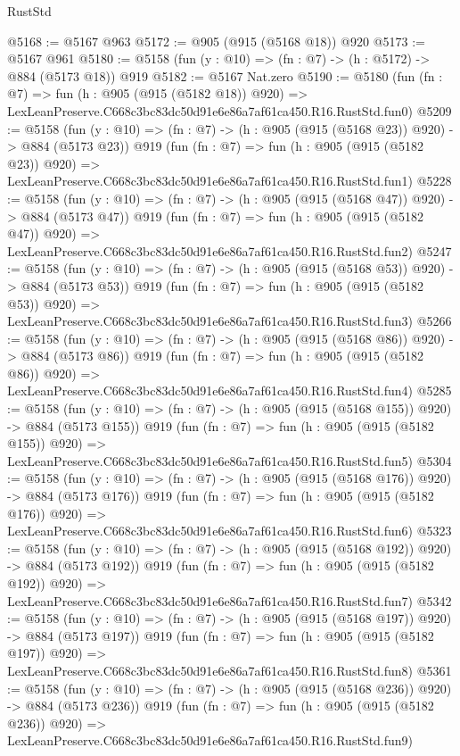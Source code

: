 \begin{lexlean}{RustStd}
\begin{coremodule}
@5168 := @5167 @963
@5172 := @905 (@915 (@5168 @18)) @920
@5173 := @5167 @961
@5180 := @5158 (fun (y : @10) => (fn : @7) -> (h : @5172) -> @884 (@5173 @18)) @919
@5182 := @5167 Nat.zero
@5190 := @5180
    (fun (fn : @7) =>
    fun (h : @905 (@915 (@5182 @18)) @920) =>
    LexLeanPreserve.C668c3bc83dc50d91e6e86a7af61ca450.R16.RustStd.fun0)
@5209 := @5158
    (fun (y : @10) => (fn : @7) -> (h : @905 (@915 (@5168 @23)) @920) -> @884 (@5173 @23))
    @919
    (fun (fn : @7) =>
    fun (h : @905 (@915 (@5182 @23)) @920) =>
    LexLeanPreserve.C668c3bc83dc50d91e6e86a7af61ca450.R16.RustStd.fun1)
@5228 := @5158
    (fun (y : @10) => (fn : @7) -> (h : @905 (@915 (@5168 @47)) @920) -> @884 (@5173 @47))
    @919
    (fun (fn : @7) =>
    fun (h : @905 (@915 (@5182 @47)) @920) =>
    LexLeanPreserve.C668c3bc83dc50d91e6e86a7af61ca450.R16.RustStd.fun2)
@5247 := @5158
    (fun (y : @10) => (fn : @7) -> (h : @905 (@915 (@5168 @53)) @920) -> @884 (@5173 @53))
    @919
    (fun (fn : @7) =>
    fun (h : @905 (@915 (@5182 @53)) @920) =>
    LexLeanPreserve.C668c3bc83dc50d91e6e86a7af61ca450.R16.RustStd.fun3)
@5266 := @5158
    (fun (y : @10) => (fn : @7) -> (h : @905 (@915 (@5168 @86)) @920) -> @884 (@5173 @86))
    @919
    (fun (fn : @7) =>
    fun (h : @905 (@915 (@5182 @86)) @920) =>
    LexLeanPreserve.C668c3bc83dc50d91e6e86a7af61ca450.R16.RustStd.fun4)
@5285 := @5158
    (fun (y : @10) => (fn : @7) -> (h : @905 (@915 (@5168 @155)) @920) -> @884 (@5173 @155))
    @919
    (fun (fn : @7) =>
    fun (h : @905 (@915 (@5182 @155)) @920) =>
    LexLeanPreserve.C668c3bc83dc50d91e6e86a7af61ca450.R16.RustStd.fun5)
@5304 := @5158
    (fun (y : @10) => (fn : @7) -> (h : @905 (@915 (@5168 @176)) @920) -> @884 (@5173 @176))
    @919
    (fun (fn : @7) =>
    fun (h : @905 (@915 (@5182 @176)) @920) =>
    LexLeanPreserve.C668c3bc83dc50d91e6e86a7af61ca450.R16.RustStd.fun6)
@5323 := @5158
    (fun (y : @10) => (fn : @7) -> (h : @905 (@915 (@5168 @192)) @920) -> @884 (@5173 @192))
    @919
    (fun (fn : @7) =>
    fun (h : @905 (@915 (@5182 @192)) @920) =>
    LexLeanPreserve.C668c3bc83dc50d91e6e86a7af61ca450.R16.RustStd.fun7)
@5342 := @5158
    (fun (y : @10) => (fn : @7) -> (h : @905 (@915 (@5168 @197)) @920) -> @884 (@5173 @197))
    @919
    (fun (fn : @7) =>
    fun (h : @905 (@915 (@5182 @197)) @920) =>
    LexLeanPreserve.C668c3bc83dc50d91e6e86a7af61ca450.R16.RustStd.fun8)
@5361 := @5158
    (fun (y : @10) => (fn : @7) -> (h : @905 (@915 (@5168 @236)) @920) -> @884 (@5173 @236))
    @919
    (fun (fn : @7) =>
    fun (h : @905 (@915 (@5182 @236)) @920) =>
    LexLeanPreserve.C668c3bc83dc50d91e6e86a7af61ca450.R16.RustStd.fun9)

\end{coremodule}
\end{lexlean}
